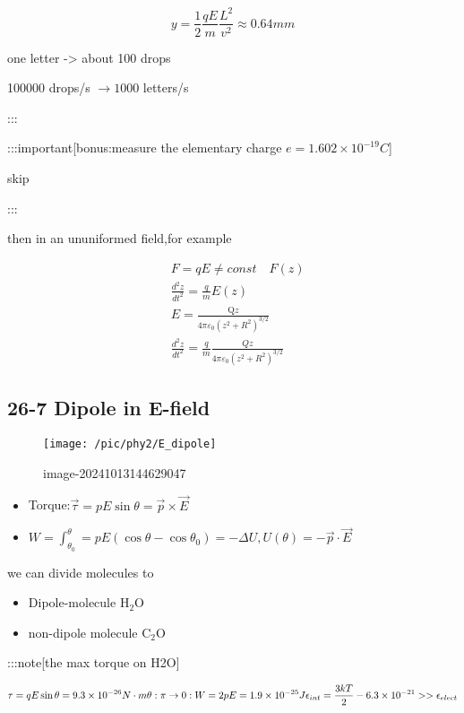 \documentclass[
]{article}
\providecommand{\tightlist}{%
  \setlength{\itemsep}{0pt}\setlength{\parskip}{0pt}}
\begin{document}
\[
y=\frac{1}{2}\frac{qE}{m}\frac{L^2}{v^2}\approx 0.64mm
\]

one letter -\textgreater{} about 100 drops

100000 drops/s \(\to 1000\) letters/s

:::

:::important{[}bonus:measure the elementary charge
\(e=1.602\times 10^{-19}C\){]}

skip

:::

then in an ununiformed field,for example

\[
\begin{aligned}
&F=qE\neq const\quad F(z) \\
&\frac{d^{2}z}{dt^{2}}=\frac{q}{m}E(z) \\
&E=\frac{\mathrm{Q}z}{4\pi\varepsilon_{0}(z^{2}+R^{2})^{3/2}} \\
&\frac{d^{2}z}{dt^{2}}=\frac{q}{m}\frac{Qz}{4\pi\varepsilon_{0}(z^{2}+R^{2})^{3/2}}
\end{aligned}
\]

\hypertarget{dipole-in-e-field}{%
\subsection{26-7 Dipole in E-field}\label{dipole-in-e-field}}

\begin{figure}
\centering
\texttt{[image: /pic/phy2/E\_dipole]}
\caption{image-20241013144629047}
\end{figure}

\begin{itemize}
\tightlist
\item
  Torque:\(\vec \tau=pE\sin \theta=\vec p\times \vec E\)
\item
  \(W=\int _{\theta_0}^\theta =pE(\cos \theta -\cos \theta_0)=-\Delta U,U(\theta)=-\vec p\cdot \vec E\)
\end{itemize}

we can divide molecules to

\begin{itemize}
\tightlist
\item
  Dipole-molecule \(\mathrm{H_2O}\)
\item
  non-dipole molecule \(\mathrm{C_2O}\)
\end{itemize}

:::note{[}the max torque on H2O{]}

\[
\tau =qE\sin \theta =9.3\times 10^{-26}N\cdot m\\
\\
\theta :\pi\to 0 :W=2pE=1.9\times 10^{-25}J\\
\epsilon _{int}=\frac{3kT}{2}-6.3\times 10^{-21}>>\epsilon _{elect}
\]
\end{document}
